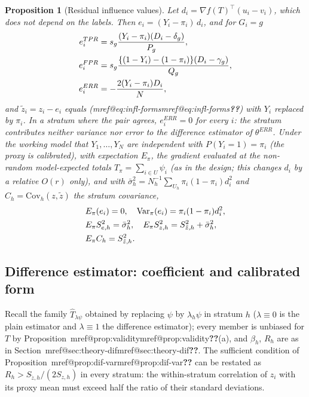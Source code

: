 \documentclass[pdflatex,sn-mathphys-num,iicol]{sn-jnl}
\makeatletter
\theoremstyle{thmstyleone}
\newtheorem{proposition}{Proposition}
\theoremstyle{thmstyletwo}
\theoremstyle{thmstylethree}
\newcommand{\Mref}[1]{\ifcsname mref@#1\endcsname\csname mref@#1\endcsname\else\textbf{??}\fi}
\makeatother
\begin{document}
\begin{proposition}[Residual influence values]\label{prop:residual}
Let $d_i=\nabla f(T)^\top(u_i-v_i)$, which does not depend on the labels. Then $e_i=(Y_i-\pi_i)\,d_i$, and for $G_i=g$
\begin{align}
e^{TPR}_i&=s_g\frac{(Y_i-\pi_i)(D_i-\delta_g)}{P_g},\notag\\
e^{FPR}_i&=s_g\frac{\{(1-Y_i)-(1-\pi_i)\}(D_i-\gamma_g)}{Q_g},\notag\\
e^{ERR}_i&=-\frac{2(Y_i-\pi_i)D_i}{N},\label{eq:resid-forms}
\end{align}
and $\tilde z_i=z_i-e_i$ equals (\Mref{eq:infl-forms}) with $Y_i$ replaced by $\pi_i$. In a stratum where the pair agrees,
$e^{ERR}_i=0$ for every $i$: the stratum contributes neither variance nor error to the difference estimator of $\theta^{ERR}$.
Under the working model that $Y_1,\dots,Y_N$ are independent with $P(Y_i=1)=\pi_i$ (the proxy is calibrated), with expectation $E_\pi$,
the gradient evaluated at the non-random model-expected totals $T_\pi=\sum_{i\in U}\psi_i$ (as in the design; this changes $d_i$ by a relative $O(r)$ only),
and with $\bar\sigma^2_h=N_h^{-1}\sum_{U_h}\pi_i(1-\pi_i)d_i^2$ and $C_h=\mathrm{Cov}_h(z,\tilde z)$ the stratum covariance,
\begin{align}
&E_\pi(e_i)=0,\quad \mathrm{Var}_\pi(e_i)=\pi_i(1-\pi_i)d_i^2,\notag\\
&E_\pi S^2_{e,h}=\bar\sigma^2_h,\quad E_\pi S^2_{z,h}=S^2_{\tilde z,h}+\bar\sigma^2_h,\notag\\
&E_\pi C_h=S^2_{\tilde z,h}.\label{eq:resid-moments}
\end{align}
\end{proposition}

\subsection{Difference estimator: coefficient and calibrated form}\label{si:theory-dif}

Recall the family $\hat T_{\lambda\psi}$ obtained by replacing $\psi$ by $\lambda_h\psi$ in stratum $h$ ($\lambda\equiv0$ is the plain estimator and $\lambda\equiv1$
the difference estimator); every member is unbiased for $T$ by Proposition~\Mref{prop:validity}(a), and $\beta_h$, $R_h$ are as in Section~\Mref{sec:theory-dif}.
The sufficient condition of Proposition~\Mref{prop:dif-var} can be restated as $R_h>S_{\tilde z,h}/(2S_{z,h})$ in every stratum: the within-stratum correlation of $z_i$ with its proxy mean must exceed half the ratio of their standard deviations.
\end{document}
